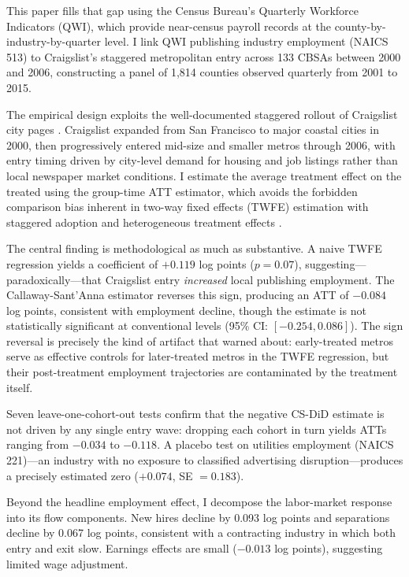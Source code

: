 \documentclass[12pt]{article}
\begin{document}
This paper fills that gap using the Census Bureau's Quarterly Workforce Indicators (QWI), which provide near-census payroll records at the county-by-industry-by-quarter level. I link QWI publishing industry employment (NAICS 513) to Craigslist's staggered metropolitan entry across 133 CBSAs between 2000 and 2006, constructing a panel of 1,814 counties observed quarterly from 2001 to 2015.

The empirical design exploits the well-documented staggered rollout of Craigslist city pages \citep{kroft_pope_2014, seamans_zhu_2014}. Craigslist expanded from San Francisco to major coastal cities in 2000, then progressively entered mid-size and smaller metros through 2006, with entry timing driven by city-level demand for housing and job listings rather than local newspaper market conditions. I estimate the average treatment effect on the treated using the \citet{callaway_santanna_2021} group-time ATT estimator, which avoids the forbidden comparison bias inherent in two-way fixed effects (TWFE) estimation with staggered adoption and heterogeneous treatment effects \citep{goodman_bacon_2021, sun_abraham_2021, dechaisemartin_dhaultfoeuille_2020}.

The central finding is methodological as much as substantive. A naive TWFE regression yields a coefficient of $+0.119$ log points ($p = 0.07$), suggesting---paradoxically---that Craigslist entry \emph{increased} local publishing employment. The Callaway-Sant'Anna estimator reverses this sign, producing an ATT of $-0.084$ log points, consistent with employment decline, though the estimate is not statistically significant at conventional levels (95\% CI: $[-0.254, 0.086]$). The sign reversal is precisely the kind of artifact that \citet{goodman_bacon_2021} warned about: early-treated metros serve as effective controls for later-treated metros in the TWFE regression, but their post-treatment employment trajectories are contaminated by the treatment itself.

Seven leave-one-cohort-out tests confirm that the negative CS-DiD estimate is not driven by any single entry wave: dropping each cohort in turn yields ATTs ranging from $-0.034$ to $-0.118$. A placebo test on utilities employment (NAICS 221)---an industry with no exposure to classified advertising disruption---produces a precisely estimated zero ($+0.074$, SE $= 0.183$).

Beyond the headline employment effect, I decompose the labor-market response into its flow components. New hires decline by 0.093 log points and separations decline by 0.067 log points, consistent with a contracting industry in which both entry and exit slow. Earnings effects are small ($-0.013$ log points), suggesting limited wage adjustment.
\end{document}
